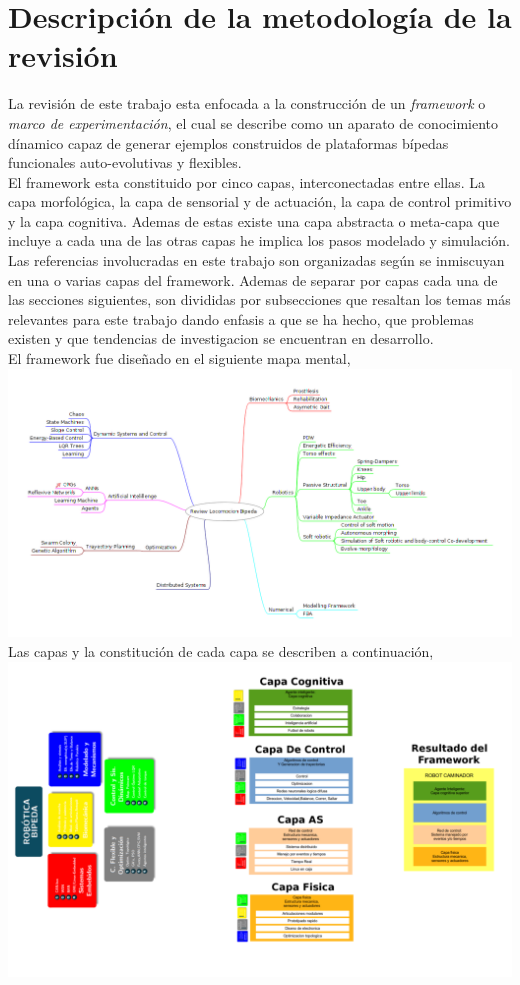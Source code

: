 \documentclass[10pt,onecolumn,twoside,letterpaper]{article}
\begin{document}
\section{Descripci\'on de la metodolog\'ia de la revisi\'on}
La revisi\'on de este trabajo esta enfocada a la construcci\'on de un \emph{framework} o \emph{marco de experimentaci\'on}, el cual se describe como un aparato de conocimiento d\'inamico capaz de generar ejemplos construidos de plataformas b\'ipedas funcionales auto-evolutivas y flexibles.\\
El framework esta constituido por cinco capas, interconectadas entre ellas. La capa morfol\'ogica, la capa de sensorial y de actuaci\'on, la capa de control primitivo y la capa cognitiva. Ademas de estas existe una capa abstracta o meta-capa que incluye a cada una de las otras capas he implica los pasos modelado y simulaci\'on.\\
Las referencias involucradas en este trabajo son organizadas seg\'un se inmiscuyan en una o varias capas del framework. Ademas de separar por capas cada una de las secciones siguientes, son divididas por subsecciones que resaltan los temas m\'as relevantes para este trabajo dando enfasis a que se ha hecho, que problemas existen y que tendencias de investigacion se encuentran en desarrollo.\\
El framework fue dise\~nado en el siguiente mapa mental,\\
\includegraphics[scale=0.4]{../../images/MindPlaneReviewLocomocionBipeda.png}\\
Las capas y la constituci\'on de cada capa se describen a continuaci\'on,\\
\includegraphics[scale=0.5]{../../images/MakeTheFramework_7.png}\\
\end{document}

